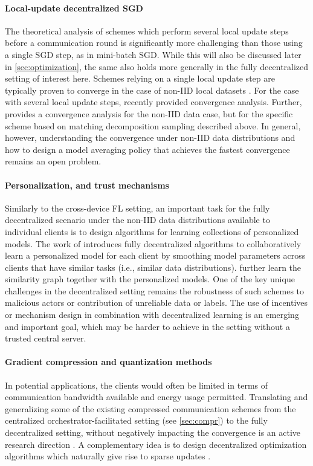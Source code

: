 \documentclass[11pt]{article}
\begin{document}
\paragraph{Local-update decentralized SGD}
The theoretical analysis of schemes which perform several local update steps before a communication round is significantly more challenging than those using a single SGD step, as in mini-batch SGD. While this will also be discussed later in \cref{sec:optimization}, the same also holds more generally in the fully decentralized setting of interest here. Schemes relying on a single local update step are typically proven to converge in the case of non-IID local datasets \citep{Koloskova2019, koloskova2019deep}. For the case with several local update steps, \citep{wang2018cooperative,decentralized_sgd2} recently provided convergence analysis. Further, \citep{wang2019matcha} provides a convergence analysis for the non-IID data case, but for the specific scheme based on matching decomposition sampling described above. In general, however, understanding the convergence under non-IID data distributions and how to design a model averaging policy that achieves the fastest convergence remains an open problem.


\paragraph{Personalization, and trust mechanisms}
Similarly to the cross-device FL setting, an important task for the fully decentralized scenario under the non-IID data distributions available to individual clients is to design algorithms for learning collections of personalized models. The work of \citep{Vanhaesebrouck2017,Bellet2018a} introduces fully decentralized algorithms to collaboratively learn a personalized model for each client by smoothing model parameters across clients that have similar tasks (i.e., similar data distributions). \citet{Zantedeschi2019} further learn the similarity graph together with the personalized models. One of the key unique challenges in the decentralized setting remains the robustness of such schemes to malicious actors or contribution of unreliable data or labels. The use of incentives or mechanism design in combination with decentralized learning is an emerging and important goal, which may be harder to achieve in the setting without a trusted central server.


\paragraph{Gradient compression and quantization methods}
In potential applications, the clients would often be limited in terms of communication bandwidth available and energy usage permitted. Translating and generalizing some of the existing compressed communication schemes from the centralized orchestrator-facilitated setting (see \cref{sec:compr}) to the fully decentralized setting, without negatively impacting the convergence is an active research direction \citep{Koloskova2019, reisizadeh2019robust, tang2019texttt, koloskova2019deep}.
A complementary idea is to design decentralized optimization algorithms which naturally give rise to sparse updates \citep{Zantedeschi2019}.
\end{document}
